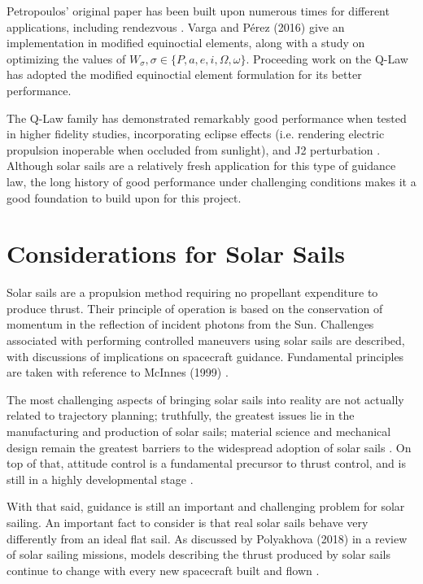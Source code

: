 Petropoulos' original paper has been built upon numerous times for different applications, including rendezvous \cite{sanjeev2023}. Varga and Pérez (2016) \cite{vargaperez2016} give an implementation in modified equinoctial elements, along with a study on optimizing the values of \(W_\sigma, \sigma \in \{P, a, e, i, \Omega, \omega\}\). Proceeding work on the Q-Law has adopted the modified equinoctial element formulation \cite{sanjeev2023} for its better performance.

The Q-Law family has demonstrated remarkably good performance when tested in higher fidelity studies, incorporating eclipse effects (i.e. rendering electric propulsion inoperable when occluded from sunlight), and J2 perturbation \cite{vargaperez2016}. Although solar sails are a relatively fresh application for this type of guidance law, the long history of good performance under challenging conditions makes it a good foundation to build upon for this project.

\section{Considerations for Solar Sails}
Solar sails are a propulsion method requiring no propellant expenditure to produce thrust. Their principle of operation is based on the conservation of momentum in the reflection of incident photons from the Sun. Challenges associated with performing controlled maneuvers using solar sails are described, with discussions of implications on spacecraft guidance. Fundamental principles are taken with reference to McInnes (1999) \cite{mcinnes}.

The most challenging aspects of bringing solar sails into reality are not actually related to trajectory planning; truthfully, the greatest issues lie in the manufacturing and production of solar sails; material science and mechanical design remain the greatest barriers to the widespread adoption of solar sails \cite{mcinnes}. On top of that, attitude control is a fundamental precursor to thrust control, and is still in a highly developmental stage \cite{choi2015structural}.

With that said, guidance is still an important and challenging problem for solar sailing. An important fact to consider is that real solar sails behave very differently from an ideal flat sail. As discussed by Polyakhova (2018) in a review of solar sailing missions, models describing the thrust produced by solar sails continue to change with every new spacecraft built and flown \cite{polyakhova2018solar}.

